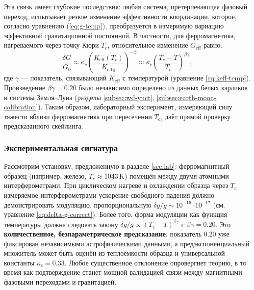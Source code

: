 \documentclass[12pt]{article}
\theoremstyle{remark}
\newcommand{\Keff}{K_{\mathrm{eff}}}
\begin{document}
	Эта связь имеет глубокие последствия: любая система, претерпевающая фазовый переход, испытывает резкое изменение эффективности координации, которое, согласно уравнению (\ref{eq:g-temp}), преобразуется в измеримую вариацию эффективной гравитационной постоянной. В частности, для ферромагнетика, нагреваемого через точку Кюри \(T_c\), относительное изменение \(G_{\mathrm{eff}}\) равно:
	\[
	\frac{\delta G}{G_0} \approx \kappa_c \left( \frac{\Keff(T_c)}{{\Keff}_{0}} \right)^{-\beta} \approx \kappa_c \left( \frac{T_c - T}{T_c} \right)^{\beta\gamma},
	\]
	где \(\gamma\) — показатель, связывающий \(\Keff\) с температурой (уравнение \ref{eq:keff-temp}). Произведение \(\beta\gamma = 0.20\) было независимо определено из данных белых карликов и системы Земля–Луна (разделы \ref{subsec:wd-yuct}, \ref{subsec:earth-moon-calibration}). Таким образом, лабораторный эксперимент, измеряющий силу тяжести вблизи ферромагнетика при пересечении \(T_c\), даёт прямой проверку предсказанного скейлинга.
	
	\subsubsection{Экспериментальная сигнатура}
	Рассмотрим установку, предложенную в разделе \ref{sec:lab}: ферромагнитный образец (например, железо, \(T_c \approx 1043\,\mathrm{K}\)) помещён между двумя атомными интерферометрами. При циклическом нагреве и охлаждении образца через \(T_c\) измеряемое интерферометрами ускорение свободного падения должно демонстрировать модуляцию, пропорциональную \(\delta g/g \sim 10^{-16}\)–\(10^{-17}\) (см. уравнение \ref{eq:delta-g-correct}). Более того, форма модуляции как функция температуры должна следовать закону \(\delta g/g \propto (T_c - T)^{\beta\gamma}\) с \(\beta\gamma = 0.20\). Это \textbf{количественное, безпараметрическое предсказание}: показатель \(0.20\) уже фиксирован независимыми астрофизическими данными, а предэкспоненциальный множитель может быть оценён из теплоёмкости образца и универсальной константы \(\kappa_c = 0.33\). Любое существенное отклонение опровергнет теорию, в то время как подтверждение станет мощной валидацией связи между магнитными фазовыми переходами и гравитацией.
	
\end{document}
